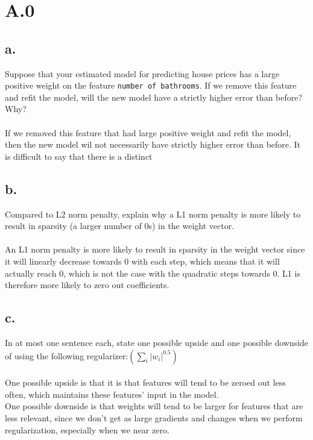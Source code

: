\documentclass{article}
\date{{}}
\newcommand{\1}{\mathbf{1}}
\begin{document}
\thispagestyle{firstpageheader}

\section*{A.0}
{\Large 


\subsection*{a.}

Suppose that your estimated model for predicting house prices has a large positive weight on the feature \texttt{number of bathrooms}. If we remove this feature and refit the model, will the new model have a strictly higher error than before? Why? \\ \\

If we removed this feature that had large positive weight and refit the model, then the new model wil not necessarily have strictly higher error than before. It is difficult to say that there is a distinct 

\subsection*{b.}

Compared to L2 norm penalty, explain why a L1 norm penalty is more likely to result in sparsity (a larger number of 0s) in the weight vector. \\ \\ 

An L1 norm penalty is more likely to result in sparsity in the weight vector since it will linearly decrease towards 0 with each step, which means that it will actually reach 0, which is not the case with the quadratic steps towards 0. L1 is therefore more likely to zero out coefficients.

\subsection*{c.}

In at most one sentence each, state one possible upside and one possible downside of using the following regularizer:$\left(\sum_{i}\left|w_{i}\right|^{0.5}\right)$ \\ \\
One possible upside is that it is that features will tend to be zeroed out less often, which maintains these features' input in the model. \\ 
One possible downside is that weights will tend to be larger for features that are less relevant, since we don't get as large gradients and changes when we perform regularization, especially when we near zero.

}
\end{document}
